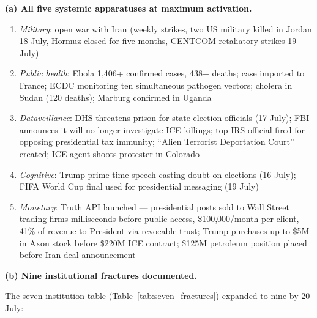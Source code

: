 \documentclass[12pt,a4paper]{article}
\begin{document}
\textbf{(a) All five systemic apparatuses at maximum activation.}

\begin{enumerate}[leftmargin=2em]
    \item \emph{Military}: open war with Iran (weekly strikes, two US military killed in Jordan 18 July, Hormuz closed for five months, CENTCOM retaliatory strikes 19 July)
    \item \emph{Public health}: Ebola 1,406+ confirmed cases, 438+ deaths; case imported to France; ECDC monitoring ten simultaneous pathogen vectors; cholera in Sudan (120 deaths); Marburg confirmed in Uganda
    \item \emph{Dataveillance}: DHS threatens prison for state election officials (17 July); FBI announces it will no longer investigate ICE killings; top IRS official fired for opposing presidential tax immunity; ``Alien Terrorist Deportation Court'' created; ICE agent shoots protester in Colorado
    \item \emph{Cognitive}: Trump prime-time speech casting doubt on elections (16 July); FIFA World Cup final used for presidential messaging (19 July)
    \item \emph{Monetary}: Truth API launched --- presidential posts sold to Wall Street trading firms milliseconds before public access, \$100,000/month per client, 41\% of revenue to President via revocable trust; Trump purchases up to \$5M in Axon stock before \$220M ICE contract; \$125M petroleum position placed before Iran deal announcement
\end{enumerate}

\textbf{(b) Nine institutional fractures documented.}

The seven-institution table (Table~\ref{tab:seven_fractures}) expanded to nine by 20 July:
\end{document}
